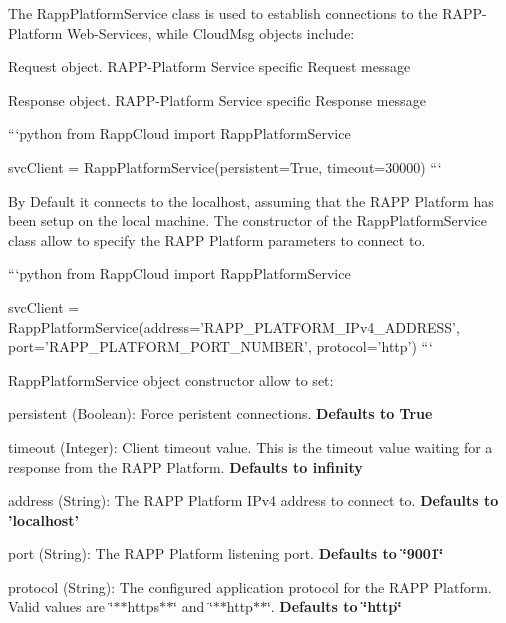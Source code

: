 The {\ttfamily Rapp\-Platform\-Service} class is used to establish connections to the R\-A\-P\-P-\/\-Platform Web-\/\-Services, while {\ttfamily Cloud\-Msg} objects include\-:
\begin{DoxyItemize}
\item {\ttfamily Request} object. R\-A\-P\-P-\/\-Platform Service specific Request message
\item {\ttfamily Response} object. R\-A\-P\-P-\/\-Platform Service specific Response message
\end{DoxyItemize}

```python from Rapp\-Cloud import Rapp\-Platform\-Service

svc\-Client = Rapp\-Platform\-Service(persistent=True, timeout=30000) ```

By Default it connects to the localhost, assuming that the R\-A\-P\-P Platform has been setup on the local machine. The constructor of the {\ttfamily Rapp\-Platform\-Service} class allow to specify the R\-A\-P\-P Platform parameters to connect to.

```python from Rapp\-Cloud import Rapp\-Platform\-Service

svc\-Client = Rapp\-Platform\-Service(address='R\-A\-P\-P\-\_\-\-P\-L\-A\-T\-F\-O\-R\-M\-\_\-\-I\-Pv4\-\_\-\-A\-D\-D\-R\-E\-S\-S', port='R\-A\-P\-P\-\_\-\-P\-L\-A\-T\-F\-O\-R\-M\-\_\-\-P\-O\-R\-T\-\_\-\-N\-U\-M\-B\-E\-R', protocol='http') ```

{\ttfamily Rapp\-Platform\-Service} object constructor allow to set\-:


\begin{DoxyItemize}
\item persistent (Boolean)\-: Force peristent connections. {\bfseries Defaults to True}
\item timeout (Integer)\-: Client timeout value. This is the timeout value waiting for a response from the R\-A\-P\-P Platform. {\bfseries Defaults to infinity}
\item address (String)\-: The R\-A\-P\-P Platform I\-Pv4 address to connect to. {\bfseries Defaults to 'localhost'}
\item port (String)\-: The R\-A\-P\-P Platform listening port. {\bfseries Defaults to \char`\"{}9001\char`\"{}}
\item protocol (String)\-: The configured application protocol for the R\-A\-P\-P Platform. Valid values are \char`\"{}$\ast$$\ast$https$\ast$$\ast$\char`\"{} and \char`\"{}$\ast$$\ast$http$\ast$$\ast$\char`\"{}. {\bfseries Defaults to \char`\"{}http\char`\"{}}
\end{DoxyItemize}

